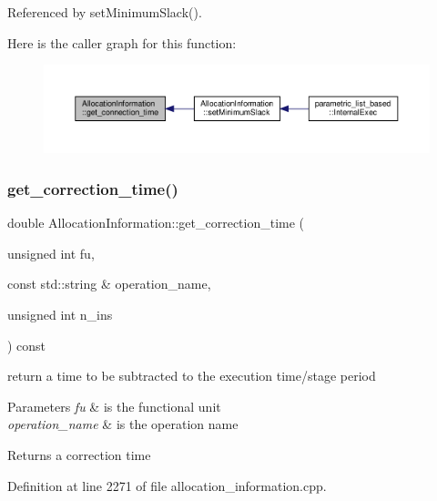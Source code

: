 Referenced by set\+Minimum\+Slack().

Here is the caller graph for this function\+:
\nopagebreak
\begin{figure}[H]
\begin{center}
\leavevmode
\includegraphics[width=350pt]{d7/d79/classAllocationInformation_a94969cbe8576878b499b71b87d4944f0_icgraph}
\end{center}
\end{figure}
\mbox{\label{classAllocationInformation_aac434b4b44cb2d6a383f8a23927f68da}} 
\subsubsection{\texorpdfstring{get\+\_\+correction\+\_\+time()}{get\_correction\_time()}}
{\footnotesize\ttfamily double Allocation\+Information\+::get\+\_\+correction\+\_\+time (\begin{DoxyParamCaption}\item[{unsigned int}]{fu,  }\item[{const std\+::string \&}]{operation\+\_\+name,  }\item[{unsigned int}]{n\+\_\+ins }\end{DoxyParamCaption}) const}



return a time to be subtracted to the execution time/stage period 


\begin{DoxyParams}{Parameters}
{\em fu} & is the functional unit \\
\hline
{\em operation\+\_\+name} & is the operation name \\
\hline
\end{DoxyParams}
\begin{DoxyReturn}{Returns}
a correction time 
\end{DoxyReturn}


Definition at line 2271 of file allocation\+\_\+information.\+cpp.



